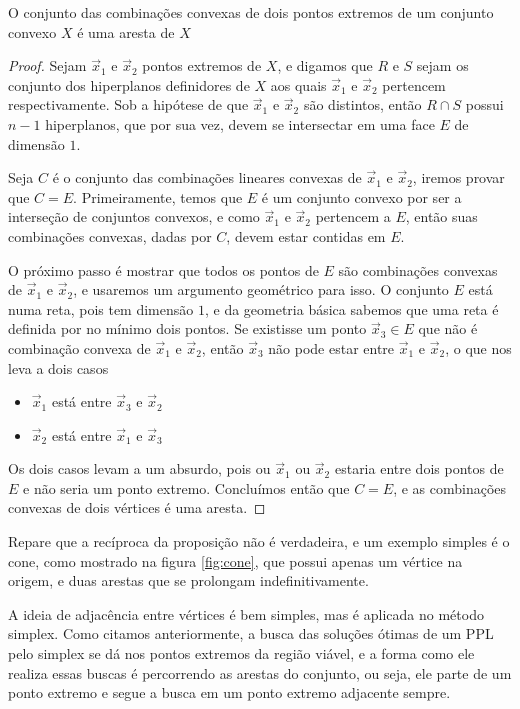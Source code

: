 \begin{prop:aresta}
	O conjunto das combinações convexas de dois pontos extremos de um conjunto convexo $X$ é uma aresta de $X$
	
	\begin{proof}
		Sejam $\vec{x}_1$ e $\vec{x}_2$ pontos extremos de $X$, e digamos que $R$ e $S$ sejam os conjunto dos hiperplanos definidores de $X$ aos quais $\vec{x}_1$ e $\vec{x}_2$ pertencem respectivamente. Sob a hipótese de que $\vec{x}_1$ e $\vec{x}_2$ são distintos, então $R \cap S$ possui $n - 1$ hiperplanos, que por sua vez, devem se intersectar em uma face $E$ de dimensão $1$.
		
		Seja $C$ é o conjunto das combinações lineares convexas de $\vec{x}_1$ e $\vec{x}_2$, iremos provar que $C = E$. Primeiramente, temos que $E$ é um conjunto convexo por ser a interseção de conjuntos convexos, e como $\vec{x}_1$ e $\vec{x}_2$ pertencem a $E$, então suas combinações convexas, dadas por $C$, devem estar contidas em $E$.
		
		O próximo passo é mostrar que todos os pontos de $E$ são combinações convexas de $\vec{x}_1$ e $\vec{x}_2$, e usaremos um argumento geométrico para isso. O conjunto $E$ está numa reta, pois tem dimensão $1$, e da geometria básica sabemos que uma reta é definida por no mínimo dois pontos. Se existisse um ponto $\vec{x}_3 \in E$ que não é combinação convexa de $\vec{x}_1$ e $\vec{x}_2$, então $\vec{x}_3$ não pode estar entre $\vec{x}_1$ e $\vec{x}_2$, o que nos leva a dois casos
		\begin{itemize}
			\item $\vec{x}_1$ está entre $\vec{x}_3$ e $\vec{x}_2$
			
			\item $\vec{x}_2$ está entre $\vec{x}_1$ e $\vec{x}_3$
		\end{itemize}
		Os dois casos levam a um absurdo, pois ou $\vec{x}_1$ ou $\vec{x}_2$ estaria entre dois pontos de $E$ e não seria um ponto extremo. Concluímos então que $C = E$, e as combinações convexas de dois vértices é uma aresta. 
	\end{proof}
\end{prop:aresta}

Repare que a recíproca da proposição não é verdadeira, e um exemplo simples é o cone, como mostrado na figura \ref{fig:cone}, que possui apenas um vértice na origem, e duas arestas que se prolongam indefinitivamente. 

A ideia de adjacência entre vértices é bem simples, mas é aplicada no método simplex. Como citamos anteriormente, a busca das soluções ótimas de um PPL pelo simplex se dá nos pontos extremos da região viável, e a forma como ele realiza essas buscas é percorrendo as arestas do conjunto, ou seja, ele parte de um ponto extremo e segue a busca em um ponto extremo adjacente sempre.  

